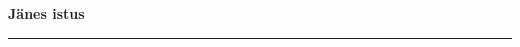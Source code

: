 \documentclass[10pt]{book}
\begin{document}
{
  \samepage
  \raggedbottom
  \raggedright
  \sloppy


  \vspace{0.2in}

  \noindent\begin{minipage}{.1\textwidth}
    \hfill\vspace{0.1in}
  \end{minipage}%
  \noindent\begin{minipage}{.8\textwidth}
    \centering
    \bfseries
    \large J\"anes istus
  \end{minipage}%
  \noindent\begin{minipage}{.1\textwidth}
      \hfill\vspace{0.1in}
  \end{minipage}

  \nopagebreak[4]
  \vspace{0.1in}
  \nopagebreak[4]
  \hrule height 0.05ex
  \nopagebreak[4]
  \vspace{-0.05in}




}
\end{document}

